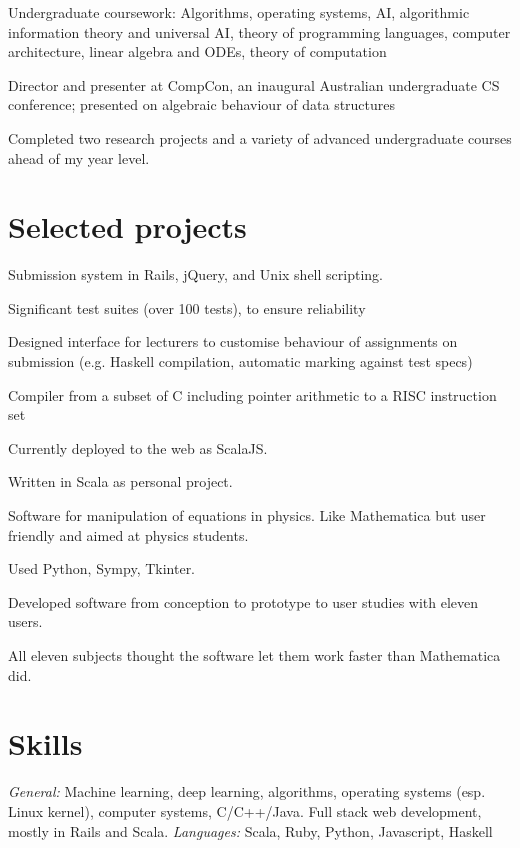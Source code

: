 \documentclass[letterpaper]{resume}
\begin{document}

\begin{compactitem}
\item Undergraduate coursework: Algorithms, operating systems, AI, algorithmic information theory and universal AI, theory of programming languages, computer architecture, linear algebra and ODEs, theory of computation
\item Director and presenter at CompCon, an inaugural Australian undergraduate CS conference; presented on algebraic behaviour of data structures
\item Completed two research projects and a variety of advanced undergraduate courses ahead of my year level.
\end{compactitem}

\section{Selected projects}

\begin{compactitem}
\item Submission system in Rails, jQuery, and Unix shell scripting.
\item Significant test suites (over 100 tests), to ensure reliability
\item Designed interface for lecturers to customise behaviour of assignments on submission (e.g. Haskell compilation, automatic marking against test specs)
\end{compactitem}

\begin{compactitem}
\item Compiler from a subset of C including pointer arithmetic to a RISC instruction set
\item Currently deployed to the web as ScalaJS.
\item Written in Scala as personal project. 
\end{compactitem}

\begin{compactitem}
\item Software for manipulation of equations in physics. Like Mathematica but user friendly and aimed at physics students.
\item Used Python, Sympy, Tkinter.
\item Developed software from conception to prototype to user studies with eleven users.
\item All eleven subjects thought the software let them work faster than Mathematica did.
\end{compactitem}


\section{Skills}
\textit{General:} Machine learning, deep learning, algorithms, operating systems (esp. Linux kernel), computer systems, C/C++/Java. Full stack web development, mostly in Rails and Scala.
\textit{Languages:} Scala, Ruby, Python, Javascript, Haskell\\
\end{document}
